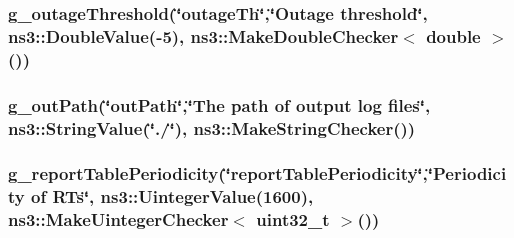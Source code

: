 \subsubsection[{\texorpdfstring{g\+\_\+outage\+Threshold}{g_outageThreshold}}]{ g\+\_\+outage\+Threshold(\char`\"{}outage\+Th\char`\"{},\char`\"{}Outage threshold\char`\"{}, ns3\+::\+Double\+Value(-\/5), {\bf ns3\+::\+Make\+Double\+Checker}$<$ double $>$())\hspace{0.3cm}{\ttfamily [static]}}\hypertarget{mc-twoenbs_8cc_af978b3efe06dda86450315ad5cf4fa7c}{}\label{mc-twoenbs_8cc_af978b3efe06dda86450315ad5cf4fa7c}
\subsubsection[{\texorpdfstring{g\+\_\+out\+Path}{g_outPath}}]{ g\+\_\+out\+Path(\char`\"{}out\+Path\char`\"{},\char`\"{}The path of output log files\char`\"{}, ns3\+::\+String\+Value(\char`\"{}./\char`\"{}), ns3\+::\+Make\+String\+Checker())\hspace{0.3cm}{\ttfamily [static]}}\hypertarget{mc-twoenbs_8cc_a3b7adf32c5e93e9c5886e2c86c732557}{}\label{mc-twoenbs_8cc_a3b7adf32c5e93e9c5886e2c86c732557}
\subsubsection[{\texorpdfstring{g\+\_\+report\+Table\+Periodicity}{g_reportTablePeriodicity}}]{ g\+\_\+report\+Table\+Periodicity(\char`\"{}report\+Table\+Periodicity\char`\"{},\char`\"{}Periodicity of R\+Ts\char`\"{}, ns3\+::\+Uinteger\+Value(1600), {\bf ns3\+::\+Make\+Uinteger\+Checker}$<$ uint32\+\_\+t $>$())\hspace{0.3cm}{\ttfamily [static]}}\hypertarget{mc-twoenbs_8cc_a7dd4f7a5a283cc11061359c91af53c35}{}\label{mc-twoenbs_8cc_a7dd4f7a5a283cc11061359c91af53c35}
